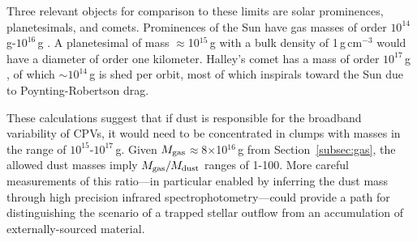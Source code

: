 \documentclass{nature3}
\begin{document}
\begin{methods}
Three relevant objects for comparison to these limits are solar
prominences, planetesimals, and comets.  Prominences of the Sun have
gas masses of order $10^{14}$\,g-$10^{16}$\,g \cite{VialEngvold2015}.
A planetesimal of mass $\approx$10$^{15}$\,g with a bulk density of
1\,g\,cm$^{-3}$ would have a diameter of order one kilometer.
Halley's comet has a mass of order $10^{17}$\,g \cite{Rickman1989}, of
which $\sim$$10^{14}$\,g is shed per orbit, most of which inspirals
toward the Sun due to Poynting-Robertson drag.

These calculations suggest that if dust is responsible for the
broadband variability of CPVs, it would need to be concentrated in
clumps with masses in the range of $10^{15}$-$10^{17}$\,g.  Given
$M_{\rm gas}$$\approx$8$\times$10$^{16}$\,g from
Section~\ref{subsec:gas}, the allowed dust masses imply $M_{\rm
gas}/M_{\rm dust}$ ranges of 1-100.  More careful measurements of this
ratio---in particular enabled by inferring the dust mass through high
precision infrared spectrophotometry---could provide a path for
distinguishing the scenario of a trapped stellar outflow from an accumulation
of externally-sourced material.




\end{methods}
\end{document}

